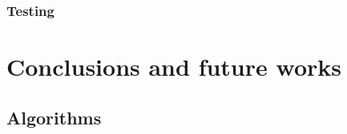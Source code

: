 \documentclass[11pt, a4paper, hidelinks]{report}
\begin{document}
\subsection{Testing}\label{subsec:testing3}

\chapter{Conclusions and future works}\label{ch:conclusions-and-future-works}

\newpage

\appendix
\renewcommand\thefigure{F.\arabic{figure}}

\section*{Algorithms}
\end{document}
